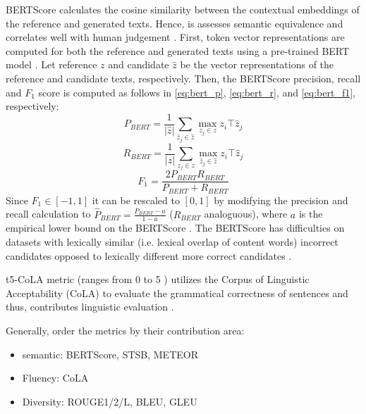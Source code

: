 BERTScore calculates the cosine similarity between the contextual embeddings of the reference and generated texts. 
Hence, is assesses semantic equivalence and correlates well with human judgement \cite{kurt_pehlivanoglu_comparative_2024}.
First, token vector representations are computed for both the reference and generated texts using a pre-trained BERT model \cite{hanna_fine_grained_2021}.
Let reference $z$ and candidate $\hat{z}$ be the vector representations of the reference and candidate texts, respectively.
Then, the BERTScore precision, recall and $F_1$ score is computed as follows in \autoref{eq:bert_p}, \autoref{eq:bert_r}, and \autoref{eq:bert_f1}, respectively:
\begin{equation}
    P_{BERT} = \frac{1}{|\hat{z}|} \sum_{\hat{z}_j \in \hat{z}} \max_{z_j \in z} z_i\top \hat{z}_j
\label{eq:bert_p}
\end{equation}
\begin{equation}
    R_{BERT} = \frac{1}{|z|} \sum_{z_j \in z} \max_{\hat{z}_j \in \hat{z}} z_i\top \hat{z}_j
\label{eq:bert_r}
\end{equation}
\begin{equation}
    F_1 = \frac{2 P_{BERT} R_{BERT}}{P_{BERT} + R_{BERT}} 
\label{eq:bert_f1}
\end{equation}
Since $F_1 \in \left[-1,1\right]$ it can be rescaled to $[0,1]$ by modifying the precision and recall calculation 
to $\hat{P}_{BERT} = \frac{P_{BERT} - a}{1 - a}$ ($R_{BERT}$ analoguous), where $a$ is the empirical lower bound on the BERTScore \cite{hanna_fine_grained_2021}.
The BERTScore has difficulties on datasets with lexically similar (i.e. lexical overlap of content words) incorrect candidates 
opposed to lexically different more correct candidates \cite{hanna_fine_grained_2021}.


\ac{t5}-CoLA metric (ranges from 0 to 5 \cite{kurt_pehlivanoglu_comparative_2024}) utilizes the Corpus of Linguistic Acceptability (CoLA) to evaluate the grammatical correctness of sentences and thus, 
contributes linguistic evaluation \cite{kurt_pehlivanoglu_comparative_2024}.

Generally, \citet{kurt_pehlivanoglu_comparative_2024} order the metrics by their contribution area:
\begin{itemize}
    \item semantic: BERTScore, STSB, METEOR
    \item Fluency: CoLA
    \item Diversity: ROUGE1/2/L, BLEU, GLEU
\end{itemize}

